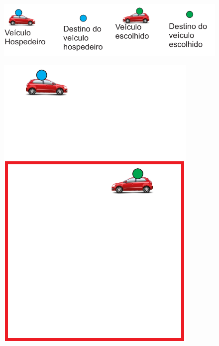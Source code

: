 \begin{figure}[htbp]
	\centering
	\includegraphics[scale=0.7]{metodologia/figuras/legendaSelecaoMelhorVeiculo.pdf}
\end{figure}

\begin{figure}[htbp]
	\centering
	\begin{minipage}{0.50\textwidth}
		\centering
		\includegraphics[scale=0.5]{metodologia/figuras/veiculoSelecionadoDentroRA.pdf}
		\label{fig:veiculoSelecionadoDentroRA}
	\end{minipage}%
	\begin{minipage}{0.50\textwidth}
		\centering

\end{minipage}
\end{figure}
